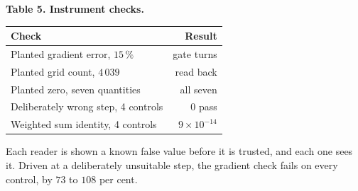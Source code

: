 \documentclass[9pt,a4paper]{article}
\renewcommand{\scriptsize}{\fontsize{5.7}{6.1}\selectfont}
\begin{document}
\begin{minipage}[t]{0.305\textwidth}
\vspace{3pt}
\textbf{Table 5. Instrument checks.}

\vspace{1.5pt}
{\fontsize{6.7}{7.9}\selectfont
\begin{tabular}{@{}l r@{}}
\toprule
Check & Result \\
\midrule
Planted gradient error, $15\,\%$    & gate turns \\
Planted grid count, $4\,039$        & read back \\
Planted zero, seven quantities      & all seven \\
Deliberately wrong step, 4 controls & $0$ pass \\
Weighted sum identity, 4 controls   & $9\times10^{-14}$ \\
\bottomrule
\end{tabular}}

\vspace{1pt}
{\scriptsize Each reader is shown a known false value before it is trusted, and
each one sees it. Driven at a deliberately unsuitable step, the gradient check
fails on every control, by $73$ to $108$ per cent.}
\end{minipage}\hfill
\end{document}
